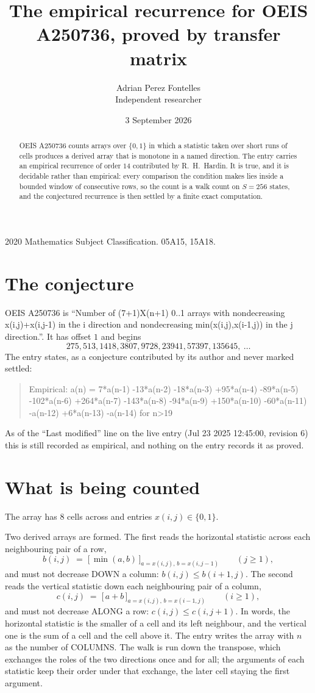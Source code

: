 \documentclass[11pt,a4paper]{article}
\title{The empirical recurrence for OEIS A250736, proved by transfer matrix}
\author{Adrian Perez Fontelles\\ \small Independent researcher}
\date{3 September 2026}
\theoremstyle{plain}
\theoremstyle{definition}
\begin{document}
\maketitle

\begin{abstract}
OEIS A250736 counts arrays over $\{0,1\}$ in which a statistic taken over short runs
of cells produces a derived array that is monotone in a named direction. The entry carries an
empirical recurrence of order $14$ contributed by R.~H.~Hardin. It is true, and it is
decidable rather than empirical: every comparison the condition makes lies inside a bounded
window of consecutive rows, so the count is a walk count on $S=256$ states, and the
conjectured recurrence is then settled by a finite exact computation.
\end{abstract}

\noindent\small 2020 Mathematics Subject Classification. 05A15, 15A18.\normalsize

\section{The conjecture}

OEIS A250736 is ``Number of (7+1)X(n+1) 0..1 arrays with nondecreasing x(i,j)+x(i,j-1) in the i direction and nondecreasing min(x(i,j),x(i-1,j)) in the j direction.''. It has offset $1$ and begins
\[
275, 513, 1418, 3807, 9728, 23941, 57397, 135645,\ \dots
\]
The entry states, as a conjecture contributed by its author and never marked settled:
\begin{quote}
Empirical: a(n) = 7*a(n-1) -13*a(n-2) -18*a(n-3) +95*a(n-4) -89*a(n-5) -102*a(n-6) +264*a(n-7) -143*a(n-8) -94*a(n-9) +150*a(n-10) -60*a(n-11) -a(n-12) +6*a(n-13) -a(n-14) for n>19
\end{quote}
As of the ``Last modified'' line on the live entry (Jul 23 2025 12:45:00, revision 6) this is still
recorded as empirical, and nothing on the entry records it as proved.

\section{What is being counted}

The array has $8$ cells across and entries $x(i,j)\in\{0,1\}$.

Two derived arrays are formed. The first reads the horizontal statistic across each
neighbouring pair of a row,
\[
b(i,j)\;=\;\bigl[\,\min(a,b)\,\bigr]_{a=x(i,j),\,b=x(i,j-1)}\qquad (j\ge1),
\]
and must not decrease DOWN a column: $b(i,j)\le b(i{+}1,j)$. The second reads the vertical
statistic down each neighbouring pair of a column,
\[
c(i,j)\;=\;\bigl[\,a+b\,\bigr]_{a=x(i,j),\,b=x(i{-}1,j)}\qquad (i\ge1),
\]
and must not decrease ALONG a row: $c(i,j)\le c(i,j{+}1)$. In words, the horizontal statistic
is the smaller of a cell and its left neighbour, and the vertical one is
the sum of a cell and the cell above it. The entry writes the array with $n$ as the number of COLUMNS. The walk is run down the transpose, which exchanges the roles of the two directions once and for all; the arguments of each statistic keep their order under that exchange, the later cell staying the first argument.
\end{document}
